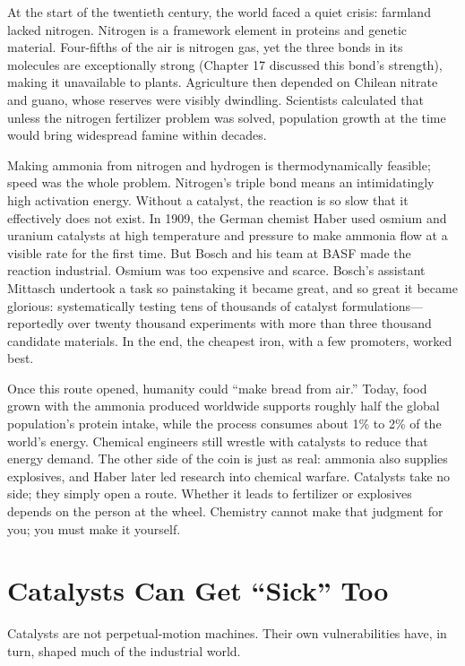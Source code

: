 \begin{zhengju}
At the start of the twentieth century, the world faced a quiet crisis: farmland lacked nitrogen. Nitrogen is a framework element in proteins and genetic material. Four-fifths of the air is nitrogen gas, yet the three bonds in its molecules are exceptionally strong (Chapter 17 discussed this bond's strength), making it unavailable to plants. Agriculture then depended on Chilean nitrate and guano, whose reserves were visibly dwindling. Scientists calculated that unless the nitrogen fertilizer problem was solved, population growth at the time would bring widespread famine within decades.

Making ammonia from nitrogen and hydrogen is thermodynamically feasible; speed was the whole problem. Nitrogen's triple bond means an intimidatingly high activation energy. Without a catalyst, the reaction is so slow that it effectively does not exist. In 1909, the German chemist Haber used osmium and uranium catalysts at high temperature and pressure to make ammonia flow at a visible rate for the first time. But Bosch and his team at BASF made the reaction industrial. Osmium was too expensive and scarce. Bosch's assistant Mittasch undertook a task so painstaking it became great, and so great it became glorious: systematically testing tens of thousands of catalyst formulations---reportedly over twenty thousand experiments with more than three thousand candidate materials. In the end, the cheapest iron, with a few promoters, worked best.

Once this route opened, humanity could ``make bread from air.'' Today, food grown with the ammonia produced worldwide supports roughly half the global population's protein intake, while the process consumes about 1\% to 2\% of the world's energy. Chemical engineers still wrestle with catalysts to reduce that energy demand. The other side of the coin is just as real: ammonia also supplies explosives, and Haber later led research into chemical warfare. Catalysts take no side; they simply open a route. Whether it leads to fertilizer or explosives depends on the person at the wheel. Chemistry cannot make that judgment for you; you must make it yourself.
\end{zhengju}

\section{Catalysts Can Get ``Sick'' Too}

Catalysts are not perpetual-motion machines. Their own vulnerabilities have, in turn, shaped much of the industrial world.

